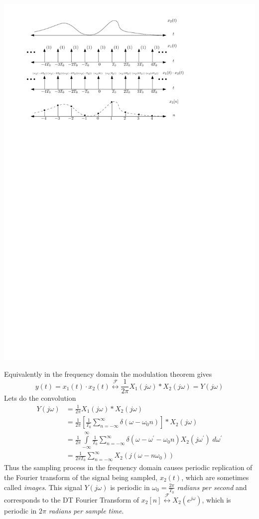 \begin{center}
  \includegraphics[scale=1]{graphics/samplinf_timedomain.pdf}
\end{center}

Equivalently in the frequency domain the modulation theorem gives
\[
y(t) = x_1(t) \cdot x_2(t) \stackrel{\mathcal{F}}{\longleftrightarrow} \frac{1}{2\pi} X_1(j\omega) * X_2(j\omega) = Y(j\omega)
\]
Lets do the convolution
\begin{align*}
  Y(j\omega) &= \frac{1}{2\pi} X_1(j\omega) * X_2(j\omega)\\
  &=  \frac{1}{2\pi} \left[  \frac{1}{T_0} \sum\limits_{n=-\infty}^{\infty} \delta(\omega - \omega_0 n) \right] * X_2(j\omega)\\
  &= \frac{1}{2\pi} \int\limits_{-\infty}^{\infty}  \frac{1}{T_0} \sum\limits_{n=-\infty}^{\infty} \delta(\omega - \omega^\prime - \omega_0 n) X_2(j\omega^\prime) \; d\omega^\prime\\
  &= \frac{1}{2\pi T_0} \sum\limits_{n=-\infty}^{\infty} X_2(j(\omega - n\omega_0)) 
\end{align*}
Thus the sampling process in the frequency domain causes periodic replication of the Fourier transform of the signal being sampled, $x_2(t)$, which are sometimes called \emph{images}. This signal $Y(j\omega)$ is periodic in $\omega_0 = \tfrac{2\pi}{T_0}$ \emph{radians per second} and corresponds to the DT Fourier Transform of $x_2[n]  \stackrel{\mathcal{F}}{\longleftrightarrow} X_2\left(e^{j\omega}\right)$, which is periodic in $2\pi$ \emph{radians per sample time}.

